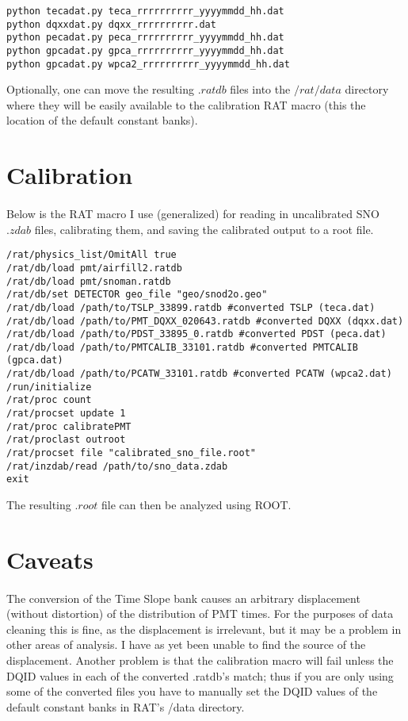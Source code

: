 \documentclass[12pt,letterpaper]{article}
\begin{document}
\begin{verbatim}
python tecadat.py teca_rrrrrrrrrr_yyyymmdd_hh.dat
python dqxxdat.py dqxx_rrrrrrrrrr.dat
python pecadat.py peca_rrrrrrrrrr_yyyymmdd_hh.dat
python gpcadat.py gpca_rrrrrrrrrr_yyyymmdd_hh.dat
python gpcadat.py wpca2_rrrrrrrrrr_yyyymmdd_hh.dat
\end{verbatim}

Optionally, one can move the resulting $.ratdb$ files into the $/rat/data$ directory where they will be easily available to the calibration RAT macro (this the location of the default constant banks).
\section{Calibration}
\paragraph{}Below is the RAT macro I use (generalized) for reading in uncalibrated SNO $.zdab$ files, calibrating them, and saving the calibrated output to a root file.
\begin{verbatim}
/rat/physics_list/OmitAll true
/rat/db/load pmt/airfill2.ratdb
/rat/db/load pmt/snoman.ratdb
/rat/db/set DETECTOR geo_file "geo/snod2o.geo"
/rat/db/load /path/to/TSLP_33899.ratdb #converted TSLP (teca.dat)
/rat/db/load /path/to/PMT_DQXX_020643.ratdb #converted DQXX (dqxx.dat)
/rat/db/load /path/to/PDST_33895_0.ratdb #converted PDST (peca.dat)
/rat/db/load /path/to/PMTCALIB_33101.ratdb #converted PMTCALIB (gpca.dat)
/rat/db/load /path/to/PCATW_33101.ratdb #converted PCATW (wpca2.dat)
/run/initialize
/rat/proc count
/rat/procset update 1
/rat/proc calibratePMT
/rat/proclast outroot
/rat/procset file "calibrated_sno_file.root"
/rat/inzdab/read /path/to/sno_data.zdab
exit
\end{verbatim}
The resulting $.root$ file can then be analyzed using ROOT.
\section{Caveats}
\paragraph{}The conversion of the Time Slope bank causes an arbitrary displacement (without distortion) of the distribution of PMT times. For the purposes of data cleaning this is fine, as the displacement is irrelevant, but it may be a problem in other areas of analysis. I have as yet been unable to find the source of the displacement. Another problem is that the calibration macro will fail unless the DQID values in each of the converted .ratdb's match; thus if you are only using some of the converted files you have to manually set the DQID values of the default constant banks in RAT's /data directory.
\end{document}
